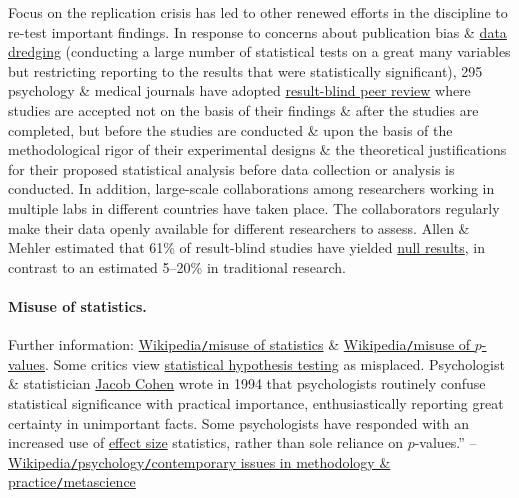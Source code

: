 \documentclass[oneside]{book}
\numberwithin{equation}{section}
\begin{document}
Focus on the replication crisis has led to other renewed efforts in the discipline to re-test important findings. In response to concerns about publication bias \& \href{https://en.wikipedia.org/wiki/Data_dredging}{data dredging} (conducting a large number of statistical tests on a great many variables but restricting reporting to the results that were statistically significant), 295 psychology \& medical journals have adopted \href{https://en.wikipedia.org/wiki/Scholarly_peer_review#Result-blind_peer_review}{result-blind peer review} where studies are accepted not on the basis of their findings \& after the studies are completed, but before the studies are conducted \& upon the basis of the methodological rigor of their experimental designs \& the theoretical justifications for their proposed statistical analysis before data collection or analysis is conducted. In addition, large-scale collaborations among researchers working in multiple labs in different countries have taken place. The collaborators regularly make their data openly available for different researchers to assess. Allen \& Mehler estimated that 61\% of result-blind studies have yielded \href{https://en.wikipedia.org/wiki/Null_result}{null results}, in contrast to an estimated 5--20\% in traditional research.

\paragraph{Misuse of statistics.} Further information: \href{https://en.wikipedia.org/wiki/Misuse_of_statistics}{Wikipedia\texttt{/}misuse of statistics} \& \href{https://en.wikipedia.org/wiki/Misuse_of_p-values}{Wikipedia\texttt{/}misuse of $p$-values}. Some critics view \href{https://en.wikipedia.org/wiki/Statistical_hypothesis_testing#Criticism}{statistical hypothesis testing} as misplaced. Psychologist \& statistician \href{https://en.wikipedia.org/wiki/Jacob_Cohen_(statistician)}{Jacob Cohen} wrote in 1994 that psychologists routinely confuse statistical significance with practical importance, enthusiastically reporting great certainty in unimportant facts. Some psychologists have responded with an increased use of \href{https://en.wikipedia.org/wiki/Effect_size}{effect size} statistics, rather than sole reliance on $p$-values.'' -- \href{https://en.wikipedia.org/wiki/Psychology#Metascience}{Wikipedia\texttt{/}psychology\texttt{/}contemporary issues in methodology \& practice\texttt{/}metascience}
\end{document}
